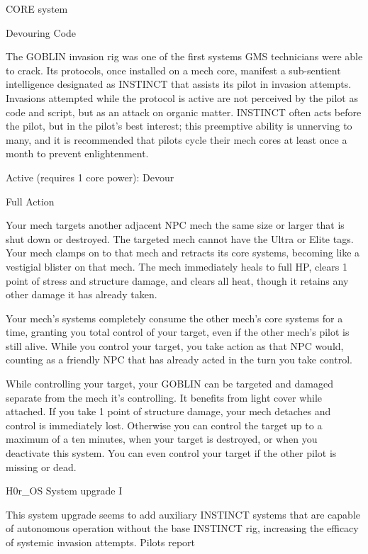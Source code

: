                                                 CORE system




                                                  Devouring Code

  The GOBLIN invasion rig was one of the first systems GMS technicians were able to crack. Its
  protocols, once installed on a mech core, manifest a sub-sentient intelligence designated as INSTINCT
  that assists its pilot in invasion attempts. Invasions attempted while the protocol is active are not
  perceived by the pilot as code and script, but as an attack on organic matter. INSTINCT often acts
  before the pilot, but in the pilot’s best interest; this preemptive ability is unnerving to many, and it is
  recommended that pilots cycle their mech cores at least once a month to prevent enlightenment.

  Active (requires 1 core power): Devour

  Full Action

  Your mech targets another adjacent NPC mech the same size or larger that is shut down or destroyed.
  The targeted mech cannot have the Ultra or Elite tags. Your mech clamps on to that mech and retracts
  its core systems, becoming like a vestigial blister on that mech. The mech immediately heals to full HP,
  clears 1 point of stress and structure damage, and clears all heat, though it retains any other damage it
  has already taken.


  Your mech’s systems completely consume the other mech’s core systems for a time, granting you total
  control of your target, even if the other mech’s pilot is still alive. While you control your target, you take
  action as that NPC would, counting as a friendly NPC that has already acted in the turn you take
  control.


  While controlling your target, your GOBLIN can be targeted and damaged separate from the mech it’s
  controlling. It benefits from light cover while attached. If you take 1 point of structure damage, your
  mech detaches and control is immediately lost. Otherwise you can control the target up to a maximum
  of a ten minutes, when your target is destroyed, or when you deactivate this system. You can even
  control your target if the other pilot is missing or dead.

H0r\_OS System upgrade I

This system upgrade seems to add auxiliary INSTINCT systems that are capable of autonomous operation
without the base INSTINCT rig, increasing the efficacy of systemic invasion attempts. Pilots report

